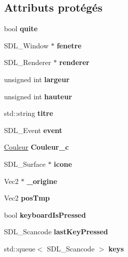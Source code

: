 \subsection*{Attributs protégés}
\begin{DoxyCompactItemize}
\item 
\mbox{\label{class_fenetre_a2ee267d5dec1a7b83562149e607641b9}} 
bool {\bfseries quite}
\item 
\mbox{\label{class_fenetre_a754610278e6d058040c269dc1458b077}} 
S\+D\+L\+\_\+\+Window $\ast$ {\bfseries fenetre}
\item 
\mbox{\label{class_fenetre_a2604e846f72a8cfda56eb2e32bcbaf83}} 
S\+D\+L\+\_\+\+Renderer $\ast$ {\bfseries renderer}
\item 
\mbox{\label{class_fenetre_a3e48790cb09f6821f40d62da9303c924}} 
unsigned int {\bfseries largeur}
\item 
\mbox{\label{class_fenetre_a4b84da27ec5957d63fcf0ae2049fa458}} 
unsigned int {\bfseries hauteur}
\item 
\mbox{\label{class_fenetre_a6ae738053171f483eca77c54396eed70}} 
std\+::string {\bfseries titre}
\item 
\mbox{\label{class_fenetre_a9489484b10b21f8d3f3f5bc5a3fe3729}} 
S\+D\+L\+\_\+\+Event {\bfseries event}
\item 
\mbox{\label{class_fenetre_a2c0f863e021033d4d47b7d1bcda0d6d3}} 
\mbox{\hyperlink{class_couleur}{Couleur}} {\bfseries Couleur\+\_\+c}
\item 
\mbox{\label{class_fenetre_ab72d03199b112a245cece0e9c660aeaf}} 
S\+D\+L\+\_\+\+Surface $\ast$ {\bfseries icone}
\item 
\mbox{\label{class_fenetre_ab8c6ea903ba940890a04da2eca8ca234}} 
Vec2 $\ast$ {\bfseries \+\_\+origine}
\item 
\mbox{\label{class_fenetre_aac87278acef1ecfd6c07948f6d4b418a}} 
Vec2 {\bfseries pos\+Tmp}
\item 
\mbox{\label{class_fenetre_afe14127a7d833e9d1b6bd56035faeca2}} 
bool {\bfseries keyboard\+Is\+Pressed}
\item 
\mbox{\label{class_fenetre_ac21a7959c423481dfd4115ac70b50a7a}} 
S\+D\+L\+\_\+\+Scancode {\bfseries last\+Key\+Pressed}
\item 
\mbox{\label{class_fenetre_ae46a9260c70796a8ec0ddd7b611c1fe6}} 
std\+::queue$<$ S\+D\+L\+\_\+\+Scancode $>$ {\bfseries keys}
\end{DoxyCompactItemize}


